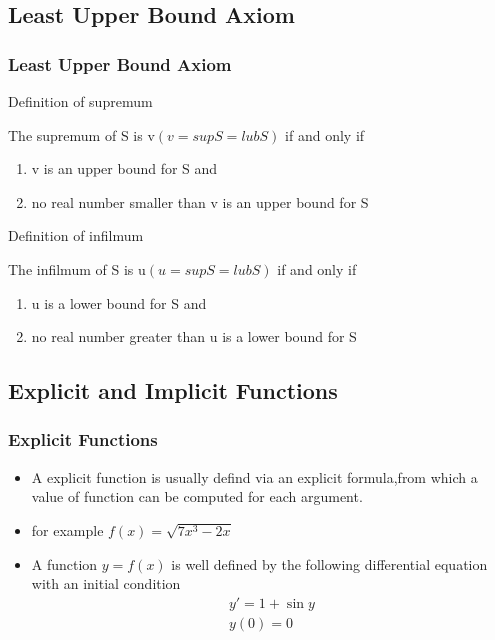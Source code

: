 \documentclass[notheorems,mathserif,table,compress]{beamer}  %
\begin{document}
\subsection{Least Upper Bound Axiom}
\begin{frame}
  \frametitle{Least Upper Bound Axiom}
  \begin{description}
 \item Definition  of  supremum

      The supremum of S is v$(v=supS=lubS)$ if  and only if

     \begin{enumerate}
       \item v is  an upper bound for S and
        \item no real  number smaller than v is  an upper bound for S
    \end{enumerate}
 
 \item Definition  of  infilmum 

      The infilmum of S is u$(u=supS=lubS)$ if  and only if

    \begin{enumerate}
     \item  u is a lower bound for S and
      \item no  real  number  greater  than  u is  a lower bound for S
     \end{enumerate}
\end{description}
\end{frame}

\subsection{Explicit and Implicit Functions}
\begin{frame}
  \frametitle{Explicit Functions}
  \begin{itemize}
\item A explicit function is usually defind via an explicit formula,from which a value of function can be computed for each  argument.
\item  for  example  $f(x)=\sqrt{7x^3-2x}$
\item A function $y=f(x)$ is well defined  by  the following  differential equation  with  an  initial  condition 
\begin{displaymath}
\begin{array}{ll}
y'=1+\sin y\\
 y(0)=0\\
\end{array} %
\end{displaymath}
\end{itemize}
\end{frame}
\end{document}
